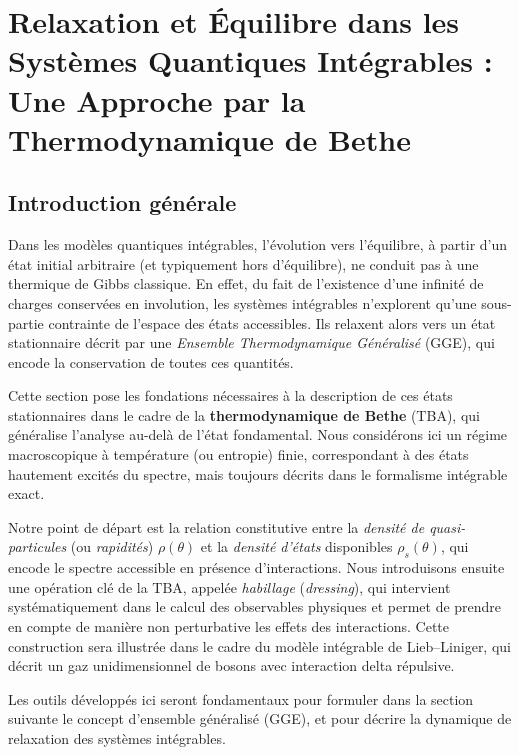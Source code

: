 \chapter{Relaxation et Équilibre dans les Systèmes Quantiques Intégrables : Une Approche par la Thermodynamique de Bethe}\label{chap:relaxation}
\minitoc

\section*{Introduction générale}

Dans les modèles quantiques intégrables, l’évolution vers l’équilibre, à partir d’un état initial arbitraire (et typiquement hors d’équilibre), ne conduit pas à une thermique de Gibbs classique.  
En effet, du fait de l’existence d’une infinité de charges conservées en involution, les systèmes intégrables n’explorent qu’une sous-partie contrainte de l’espace des états accessibles.  
Ils relaxent alors vers un état stationnaire décrit par une \emph{Ensemble Thermodynamique Généralisé} (GGE), qui encode la conservation de toutes ces quantités.

Cette section pose les fondations nécessaires à la description de ces états stationnaires dans le cadre de la \textbf{thermodynamique de Bethe} (TBA), qui généralise l’analyse au-delà de l’état fondamental.  
Nous considérons ici un régime macroscopique à température (ou entropie) finie, correspondant à des états hautement excités du spectre, mais toujours décrits dans le formalisme intégrable exact.

Notre point de départ est la relation constitutive entre la \emph{densité de quasi-particules} (ou \emph{rapidités}) $\rho(\theta)$ et la \emph{densité d’états} disponibles $\rho_s(\theta)$, qui encode le spectre accessible en présence d’interactions.  
Nous introduisons ensuite une opération clé de la TBA, appelée \emph{habillage} (\emph{dressing}), qui intervient systématiquement dans le calcul des observables physiques et permet de prendre en compte de manière non perturbative les effets des interactions.  
Cette construction sera illustrée dans le cadre du modèle intégrable de Lieb–Liniger, qui décrit un gaz unidimensionnel de bosons avec interaction delta répulsive.

Les outils développés ici seront fondamentaux pour formuler dans la section suivante le concept d’ensemble généralisé (GGE), et pour décrire la dynamique de relaxation des systèmes intégrables.



